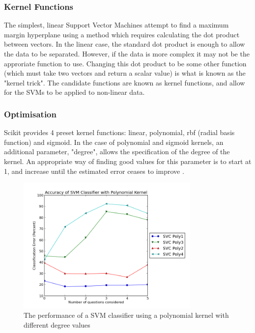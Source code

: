 \subsubsection{Kernel Functions}
The simplest, linear Support Vector Machines attempt to find a maximum margin hyperplane using a method which requires calculating the dot product between vectors. In the linear case, the standard dot product is enough to allow the data to be separated. However, if the data is more complex it may not be the approriate function to use. Changing this dot product to be some other function (which must take two vectors and return a scalar value) is what is known as the "kernel trick". The candidate functions are known as kernel functions, and allow for the SVMs to be applied to non-linear data. 

\subsubsection{Optimisation}
Scikit provides 4 preset kernel functions: linear, polynomial, rbf (radial basis function) and sigmoid. In the case of polynomial and sigmoid kernels, an additional parameter, "degree", allows the specification of the degree of the kernel. An appropriate way of finding good values for this parameter is to start at 1, and increase until the estimated error ceases to improve \cite{witten2011data}. 

\begin{figure}[h!]
\centering
\includegraphics[width=0.8\textwidth]{images/svcpoly.png}
\caption{The performance of a SVM classifier using a polynomial kernel with different degree values}
\label{fig:svcpoly}
\end{figure}

